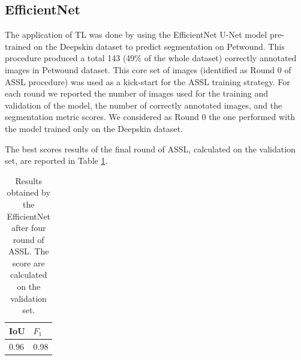 \documentclass[../main.tex]{subfiles}
\begin{document}
\subsection{EfficientNet}
The application of TL was done by using the EfficientNet U-Net model  pre-trained on the Deepskin dataset to predict segmentation on Petwound. This procedure produced a total 143 (49\% of the whole dataset) correctly annotated images in Petwound dataset. 
This core set of images (identified as Round 0 of ASSL procedure) was used as a kick-start for the ASSL training strategy.
For each round we reported the number of images used for the training and validation of the model, the number of correctly annotated images, and the segmentation metric scores. We considered as Round 0 the one performed with the model trained only on the Deepskin dataset.
\begin{table}[H]
    \centering
    \caption{Results obtained by the EfficientNet model in the ASSL training strategy on the PetWound dataset.}
    \label{tab:results-eff-petwound}
\end{table}

The best scores results of the final round of ASSL, calculated on the validation set, are reported in Table \ref{tab:results-eff-score-petwound}.
\begin{table}[H]
    \centering
    
    \begin{tabular}{|l|l|}
    \hline
          IoU  & $F_1$  \\ \hline
        0.96 & 0.98 \\ \hline
    \end{tabular}
    \caption{Results obtained by the EfficientNet after four round of ASSL. The score are calculated on the validation set.}\label{tab:results-eff-score-petwound}
\end{table}
\end{document}
